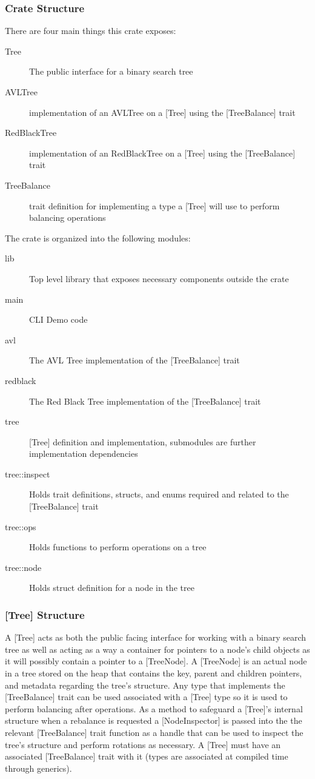 \documentclass[11pt, letterpaper]{article}
\begin{document}
\subsubsection{Crate Structure}
There are four main things this crate exposes:
\begin{description}
    \item[Tree] The public interface for a binary search tree
    \item[AVLTree] implementation of an AVLTree on a [Tree] using the [TreeBalance] trait
    \item[RedBlackTree] implementation of an RedBlackTree on a [Tree] using the [TreeBalance] trait
    \item[TreeBalance] trait definition for implementing a type a [Tree] will use to perform balancing operations
\end{description}
\hfill \break
\noindent The crate is organized into the following modules:
\begin{description}
    \item[lib] Top level library that exposes necessary components outside the crate
    \item[main] CLI Demo code
    \item[avl] The AVL Tree implementation of the [TreeBalance] trait
    \item[redblack] The Red Black Tree implementation of the [TreeBalance] trait
    \item[tree] [Tree] definition and implementation, submodules are further implementation dependencies
    \item[tree::inspect] Holds trait definitions, structs, and enums required and related to the [TreeBalance] trait
    \item[tree::ops] Holds functions to perform operations on a tree
    \item[tree::node] Holds struct definition for a node in the tree
\end{description}

\subsubsection{[Tree] Structure}
A [Tree] acts as both the public facing interface for working with a binary search tree as well as
acting as a way a container for pointers to a node's child objects as it will possibly contain
a pointer to a [TreeNode].  A [TreeNode] is an actual node in a tree stored on the heap that contains the
key, parent and children pointers, and metadata regarding the tree's structure.  Any type that implements the [TreeBalance] trait
can be used associated with a [Tree] type so it is used to perform balancing after operations.
As a method to safeguard a [Tree]'s internal structure when a rebalance is requested a [NodeInspector] is passed into the
the relevant [TreeBalance] trait function as a handle that can be used to inspect the tree's structure and perform rotations as necessary.
A [Tree] must have an associated [TreeBalance] trait with it (types are associated at compiled time through generics).
\end{document}
